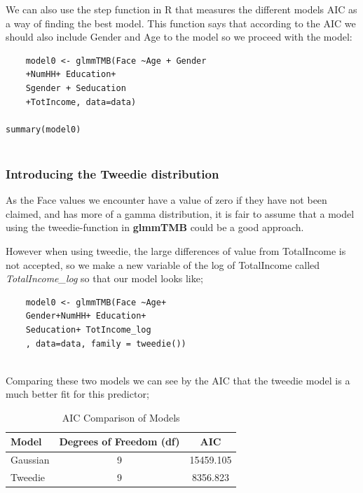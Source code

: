 \documentclass[12pt, twoside,hidelinks]{article}
\theoremstyle{definition}
\numberwithin{equation}{section}
\begin{document}
We can also use the step function in R that measures the different models AIC as a way of finding the best model. This function says that according to the AIC we should also include Gender and Age to the model so we proceed with the model:

\begin{verbatim}
    model0 <- glmmTMB(Face ~Age + Gender
    +NumHH+ Education+ 
    Sgender + Seducation
    +TotIncome, data=data)

summary(model0)
    
\end{verbatim}


\subsubsection{Introducing the Tweedie distribution}

As the Face values we encounter have a value of zero if they have not been claimed, and has more of a gamma distribution, it is fair to assume that a model using the tweedie-function in \textbf{glmmTMB} could be a good approach.
\newline

However when using tweedie, the large differences of value from TotalIncome is not accepted, so we make a new variable of the log of TotalIncome called \textit{TotalIncome\_log} so that our model looks like;

\begin{verbatim}
    model0 <- glmmTMB(Face ~Age+
    Gender+NumHH+ Education+ 
    Seducation+ TotIncome_log
    , data=data, family = tweedie())
    
\end{verbatim}

Comparing these two models we can see by the AIC that the tweedie model is a much better fit for this predictor;

\begin{table}[ht]
\centering
\caption{AIC Comparison of Models}
\begin{tabular}{lcc}
\hline
Model & Degrees of Freedom (df) & AIC \\
\hline
Gaussian & 9 & 15459.105 \\
Tweedie & 9 & 8356.823 \\
\hline
\end{tabular}
\label{tab:aic_comparison}
\end{table}
\end{document}
